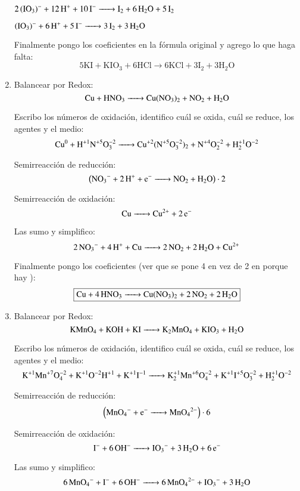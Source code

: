 \begin{enumerate}
\hfil$\ce{2(IO3)^- + 12H^+ + 10 I^- -> I2 + 6H2O + 5I2}$\hfil

\hfil$\ce{(IO3)^- + 6H^+ + 5 I^- -> 3I2 + 3H2O }$\hfil

Finalmente pongo los coeficientes en la fórmula original y agrego lo que haga falta:
\[\boxed{5\text{KI} + \text{K} \text{I} \text{O}_3 + 6\text{H} \text{Cl} \longrightarrow
6\text{KCl} + 3\text{I}_2 +  3\text{H}_2 \text{O}}\]


\newpage
\item
Balancear por Redox:
$$\ce{
Cu + HNO3 ->
Cu(NO3)2 + NO2 + H2O
}$$

Escribo los números de oxidación, identifico cuál se oxida, cuál se reduce, los agentes y el medio:
$$\ce{
Cu^0 + H^{+1}N^{+5}O^{-2}3 ->
Cu^{+2}(N^{+5}O^{-2}3)2 + N^{+4}O^{-2}2 + H^{+1}2O^{-2}
}$$


\begin{multicols}{2}
Semirreacción de reducción:
$$\left(\ce{
NO3^{-} + 2H^+ + e^- ->
NO2 + H2O
}\right)\cdot 2$$

Semirreacción de oxidación: 
$$\ce{
Cu ->
Cu^{2+} + 2e^-
}$$
\end{multicols}

Las sumo y simplifico:
$$\ce{
2NO3^{-} + 4H^+ + Cu ->
2NO2 + 2 H2O + Cu^{2+}
}$$

Finalmente pongo los coeficientes (ver que se pone 4 en vez de 2 en  porque hay ):
$$\fbox{\ce{
Cu + 4HNO3 ->
Cu(NO3)2 + 2NO2 + 2H2O
}}$$


\item
Balancear por Redox:
$$\ce{
KMnO4 + KOH + KI ->
K2MnO4 + KIO3 + H2O
}$$

Escribo los números de oxidación, identifico cuál se oxida, cuál se reduce, los agentes y el medio:
\[\ce{
K^{+1}Mn^{+7}O^{-2}4 + K^{+1}O^{-2}H^{+1} + K^{+1}I^{-1} ->
K^{+1}2Mn^{+6}O^{-2}4 + K^{+1}I^{+5}O^{-2}3 + H^{+1}2O^{-2}
}\]


\begin{multicols}{2}
Semirreacción de reducción:
$$\left(\ce{
MnO4^- +e^- ->
MnO4^{2-}
}\right)\cdot 6$$

Semirreacción de oxidación:
$$\ce{
I^{-} + 6OH^- ->
IO3^- + 3H2O + 6e^-
}$$
\end{multicols}

Las sumo y simplifico:
$$\ce{
6MnO4^- + I^- + 6OH^- ->
6MnO4^{2-} + IO3^- + 3H2O
}$$


\end{enumerate}
